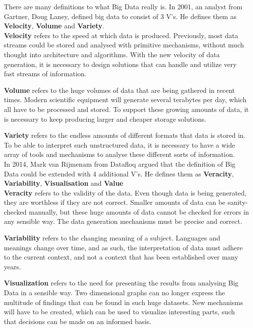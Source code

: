 \documentclass[a4paper]{article}
\begin{document}
There are many definitions to what Big Data really is. In 2001, an analyst from Gartner, Doug Laney, defined big data to consist of 3 V's\cite{3vs}. He defines them as \textbf{Velocity}, \textbf{Volume} and \textbf{Variety}.\\

\textbf{Velocity} refers to the speed at which data is produced. Previously, most data streams could be stored and analysed with primitive mechanisms, without much thought into architecture and algorithms. With the new velocity of data generation, it is necessary to design solutions that can handle and utilize very fast streams of information.

\textbf{Volume} refers to the huge volumes of data that are being gathered in recent times. Modern scientific equipment will generate several terabytes per day, which all have to be processed and stored. To support these growing amounts of data, it is necessary to keep producing larger and cheaper storage solutions.

\textbf{Variety} refers to the endless amounts of different formats that data is stored in. To be able to interpret such unstructured data, it is necessary to have a wide array of tools and mechanisms to analyse these different sorts of information.\\

In 2014, Mark van Rijmenam from Datafloq\cite{7vs} argued that the definition of Big Data could be extended with 4 additional V's. He defines them as \textbf{Veracity}, \textbf{Variability}, \textbf{Visualisation} and \textbf{Value}\\

\textbf{Veracity} refers to the validity of the data. Even though data is being generated, they are worthless if they are not correct. Smaller amounts of data can be sanity-checked manually, but these huge amounts of data cannot be checked for errors in any sensible way. The data generation mechanisms must be precise and correct.

\textbf{Variability} refers to the changing meaning of a subject. Languages and meanings change over time, and as such, the interpretation of data must adhere to the current context, and not a context that has been established over many years.

\textbf{Visualization} refers to the need for presenting the results from analysing Big Data in a sensible way. Two dimensional graphs can no longer express the multitude of findings that can be found in such huge datasets. New mechanisms will have to be created, which can be used to visualize interesting parts, such that decisions can be made on an informed basis.
\end{document}
